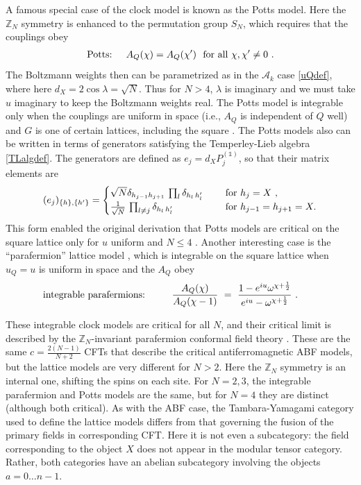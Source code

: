 A famous special case of the clock model is known as the Potts model. Here the $\mathbb{Z}_N$ symmetry is enhanced to the permutation group $S_N$, which requires that the couplings obey 
\begin{align}
\hbox{Potts: }\quad A_Q(\chi)=A_Q(\chi')\ \hbox{ for all }\chi,\chi'\ne 0\ .
\end{align}
The Boltzmann weights then can be parametrized as in the $\mathcal{A}_k$ case \eqref{uQdef}, where here $d_X=2\cos\lambda=\sqrt{N}$.
Thus for $N>4$, $\lambda$ is imaginary and we must take $u$ imaginary to keep the Boltzmann weights real.
The Potts model is integrable only when the couplings are uniform in space (i.e., $A_Q$ is independent of $Q$ well) and $G$ is one of certain lattices, including the square \cite{Baxter1982}.
The Potts models also can be written in terms of generators satisfying the Temperley-Lieb algebra \eqref{TLalgdef}.
The generators are defined as $e_j=d_X P_j^{(\mathds{1})}$, so that their matrix elements are
\begin{align}
(e_j)_{\{h\},\{h'\}}= \begin{cases}
 \sqrt{N} \delta_{h_{j-1}h_{j+1}}\,\prod_{l} \delta_{h_l\,h'_l}\quad & \hbox{ for }h_j=X\ ,\\
\tfrac{1}{\sqrt{N}}\, \prod_{l\ne j} \delta_{h_l\,h'_l} & \hbox{ for } h_{j-1}=h_{j+1}=X.
\end{cases}
\label{TLPotts}
\end{align}
This form enabled the original derivation that Potts models are critical on the square lattice only for $u$ uniform and $N\le 4$  \cite{Temperley1971}. 
Another interesting case is the ``parafermion'' lattice model \cite{Fateev82}, which is integrable on the square lattice when $u_Q=u$ is uniform in space and the $A_Q$ obey
\begin{align}
\hbox{integrable parafermions: }\qquad\  \frac{A_Q(\chi)}{A_Q(\chi-1)}\ =\  
\frac{1-e^{iu}\omega^{\chi+\frac12}}{e^{iu}-\omega^{\chi+\frac12}}\ .\qquad
	\label{paraweights}
\end{align}

These integrable clock models are critical for all $N$, and their critical limit is described by the $\mathbb{Z}_N$-invariant parafermion conformal field theory \cite{ZamoFateev:Parafermion:85}.
These are the same $c=\frac{2(N-1)}{N+2}$ CFTs that describe the critical antiferromagnetic ABF models, but the lattice models are very different for $N>2$.
Here the $\mathbb{Z}_N$ symmetry is an internal one, shifting the spins on each site.
For $N=2,3$, the integrable parafermion and Potts models are the same, but for $N=4$ they are distinct (although both critical). 
As with the ABF case, the Tambara-Yamagami category used to define the lattice models differs from that governing the fusion of the primary fields in corresponding CFT. Here it is not even a subcategory: the field corresponding to the object $X$ does not appear in the modular tensor category. Rather, both categories have an abelian subcategory involving the objects $a=0\dots n-1$. 




